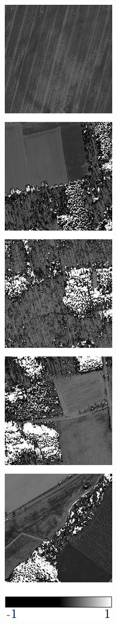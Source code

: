 \begin{figure}[h]
\begin{subfigure}{\VegetationImageWidth}
        \caption{}
        \label{fig:svi_ndvi}
    \end{subfigure} \hspace{2mm}
    \begin{subfigure}{\VegetationImageWidth}
        \includegraphics[width=\textwidth]{images/vegetation/evi}

\end{subfigure}
\end{figure}
